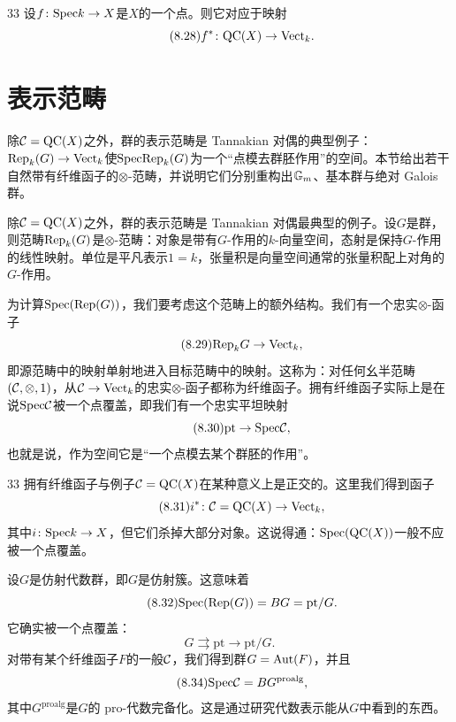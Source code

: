 \begin{srcex}{33}
设$f\colon\mathrm{Spec} k\to X$是$X$的一个点。则它对应于映射
\begin{equation}\tag{8.28}
f^{*}\colon\mathrm{QC}(X)\to\mathrm{Vect}_{k}.
\end{equation}
\end{srcex}

\section{表示范畴}\label{sec:8.1}
\begin{sectionkey}
除$\mathcal{C}=\mathrm{QC}(X)$之外，群的表示范畴是 Tannakian 对偶的典型例子：$\mathrm{Rep}_k(G)\to\mathrm{Vect}_k$使$\mathrm{Spec}\mathrm{Rep}_k(G)$为一个“点模去群胚作用”的空间。本节给出若干自然带有纤维函子的$\otimes$-范畴，并说明它们分别重构出$\mathbb{G}_m$、基本群与绝对 Galois 群。
\end{sectionkey}

除$\mathcal{C}=\mathrm{QC}(X)$之外，群的表示范畴是 Tannakian 对偶最典型的例子。设$G$是群，则范畴$\mathrm{Rep}_k(G)$是$\otimes$-范畴：对象是带有$G$-作用的$k$-向量空间，态射是保持$G$-作用的线性映射。单位是平凡表示$1=k$，张量积是向量空间通常的张量积配上对角的$G$-作用。

为计算$\mathrm{Spec}(\mathrm{Rep}(G))$，我们要考虑这个范畴上的额外结构。我们有一个忠实$\otimes$-函子
\begin{equation}\tag{8.29}
\mathrm{Rep}_k G\to\mathrm{Vect}_k,
\end{equation}
即源范畴中的映射单射地进入目标范畴中的映射。这称为：对任何幺半范畴$(\mathcal{C},\otimes,1)$，从$\mathcal{C}\to\mathrm{Vect}_k$的忠实$\otimes$-函子都称为纤维函子。拥有纤维函子实际上是在说$\mathrm{Spec}\mathcal{C}$被一个点覆盖，即我们有一个忠实平坦映射
\begin{equation}\tag{8.30}
\mathrm{pt}\to\mathrm{Spec}\mathcal{C},
\end{equation}
也就是说，作为空间它是“一个点模去某个群胚的作用”。

\begin{srcrem}{33}
拥有纤维函子与例子$\mathcal{C}=\mathrm{QC}(X)$在某种意义上是正交的。这里我们得到函子
\begin{equation}\tag{8.31}
i^{*}\colon\mathcal{C}=\mathrm{QC}(X)\to\mathrm{Vect}_k,
\end{equation}
其中$i\colon\mathrm{Spec} k\to X$，但它们杀掉大部分对象。这说得通：$\mathrm{Spec}(\mathrm{QC}(X))$一般不应被一个点覆盖。
\end{srcrem}

设$G$是仿射代数群，即$G$是仿射簇。这意味着
\begin{equation}\tag{8.32}
\mathrm{Spec}(\mathrm{Rep}(G))=BG=\mathrm{pt}/G.
\end{equation}
它确实被一个点覆盖：
\begin{equation}\tag{8.33}
G\rightrightarrows \mathrm{pt}\to \mathrm{pt}/G.
\end{equation}
对带有某个纤维函子$F$的一般$\mathcal{C}$，我们得到群$G=\mathrm{Aut}(F)$，并且
\begin{equation}\tag{8.34}
\mathrm{Spec}\mathcal{C}=BG^{\mathrm{proalg}},
\end{equation}
其中$G^{\mathrm{proalg}}$是$G$的 pro-代数完备化。这是通过研究代数表示能从$G$中看到的东西。

